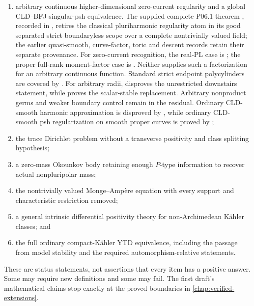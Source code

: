 \begin{enumerate}
\item arbitrary continuous higher-dimensional zero-current regularity and
  a global CLD--BFJ singular-psh equivalence. The supplied complete P06.1
  theorem , recorded in
  , retires the classical
  pluriharmonic regularity atom in its good separated strict boundaryless
  scope over a complete nontrivially valued field;
  the earlier quasi-smooth, curve-factor, toric and descent records retain
  their separate provenance. For zero-current recognition, the real-PL
  case is ; the proper
  full-rank moment-factor case is
  . Neither supplies such a
  factorization for an arbitrary continuous function. Standard strict
  endpoint polycylinders are covered by
  . For arbitrary radii,
   disproves
  the unrestricted downstairs statement, while
   proves the scalar-stable
  replacement. Arbitrary nonproduct germs and weaker boundary control
  remain in the residual. Ordinary CLD-smooth harmonic approximation is
  disproved by ,
  while ordinary CLD-smooth psh regularization on smooth proper curves is
  proved by ;
\item the trace Dirichlet problem without a transverse positivity and class
  splitting hypothesis;
\item a zero-mass Okounkov body retaining enough \(P\)-type information to
  recover actual nonpluripolar mass;
\item the nontrivially valued Monge--Ampère equation with every support and
  characteristic restriction removed;
\item a general intrinsic differential positivity theory for
  non-Archimedean Kähler classes; and
\item the full ordinary compact-Kähler YTD equivalence, including the
  passage from model stability and the required automorphism-relative
  statements.
\end{enumerate}

These are status statements, not assertions that every item has a positive
answer.  Some may require new definitions and some may fail.  The first
draft's mathematical claims stop exactly at the proved boundaries in
\cref{chap:verified-extensions}.

